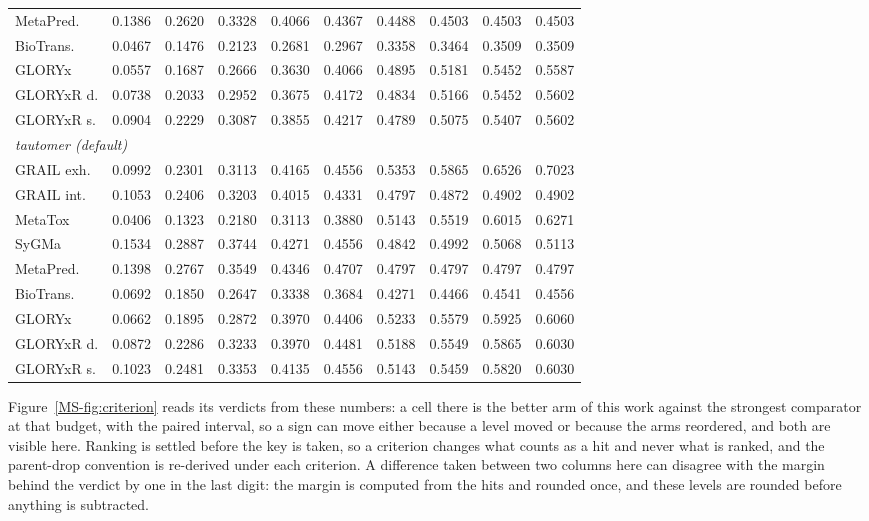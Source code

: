 \begin{table}[t]
\begin{threeparttable}
\begin{tabular}{lrrrrrrrrr}
\quad MetaPred. & 0.1386 & 0.2620 & 0.3328 & 0.4066 & 0.4367 & 0.4488 & 0.4503 & 0.4503 & 0.4503 \\
\quad BioTrans. & 0.0467 & 0.1476 & 0.2123 & 0.2681 & 0.2967 & 0.3358 & 0.3464 & 0.3509 & 0.3509 \\
\quad GLORYx & 0.0557 & 0.1687 & 0.2666 & 0.3630 & 0.4066 & 0.4895 & 0.5181 & 0.5452 & 0.5587 \\
\quad GLORYxR d. & 0.0738 & 0.2033 & 0.2952 & 0.3675 & 0.4172 & 0.4834 & 0.5166 & 0.5452 & 0.5602 \\
\quad GLORYxR s. & 0.0904 & 0.2229 & 0.3087 & 0.3855 & 0.4217 & 0.4789 & 0.5075 & 0.5407 & 0.5602 \\
\midrule
\multicolumn{10}{l}{\emph{tautomer (default)}} \\
\quad GRAIL exh. & 0.0992 & 0.2301 & 0.3113 & 0.4165 & 0.4556 & 0.5353 & 0.5865 & 0.6526 & 0.7023 \\
\quad GRAIL int. & 0.1053 & 0.2406 & 0.3203 & 0.4015 & 0.4331 & 0.4797 & 0.4872 & 0.4902 & 0.4902 \\
\quad MetaTox & 0.0406 & 0.1323 & 0.2180 & 0.3113 & 0.3880 & 0.5143 & 0.5519 & 0.6015 & 0.6271 \\
\quad SyGMa & 0.1534 & 0.2887 & 0.3744 & 0.4271 & 0.4556 & 0.4842 & 0.4992 & 0.5068 & 0.5113 \\
\quad MetaPred. & 0.1398 & 0.2767 & 0.3549 & 0.4346 & 0.4707 & 0.4797 & 0.4797 & 0.4797 & 0.4797 \\
\quad BioTrans. & 0.0692 & 0.1850 & 0.2647 & 0.3338 & 0.3684 & 0.4271 & 0.4466 & 0.4541 & 0.4556 \\
\quad GLORYx & 0.0662 & 0.1895 & 0.2872 & 0.3970 & 0.4406 & 0.5233 & 0.5579 & 0.5925 & 0.6060 \\
\quad GLORYxR d. & 0.0872 & 0.2286 & 0.3233 & 0.3970 & 0.4481 & 0.5188 & 0.5549 & 0.5865 & 0.6030 \\
\quad GLORYxR s. & 0.1023 & 0.2481 & 0.3353 & 0.4135 & 0.4556 & 0.5143 & 0.5459 & 0.5820 & 0.6030 \\
\bottomrule
\end{tabular}
\begin{tablenotes}[flushleft]\footnotesize
\item Figure~\ref{MS-fig:criterion} reads its verdicts from these numbers: a cell there is the better arm of this work against the strongest comparator at that budget, with the paired interval, so a sign can move either because a level moved or because the arms reordered, and both are visible here. Ranking is settled before the key is taken, so a criterion changes what counts as a hit and never what is ranked, and the parent-drop convention is re-derived under each criterion. A difference taken between two columns here can disagree with the margin behind the verdict by one in the last digit: the margin is computed from the hits and rounded once, and these levels are rounded before anything is subtracted.
\end{tablenotes}
\end{threeparttable}
\end{table}
